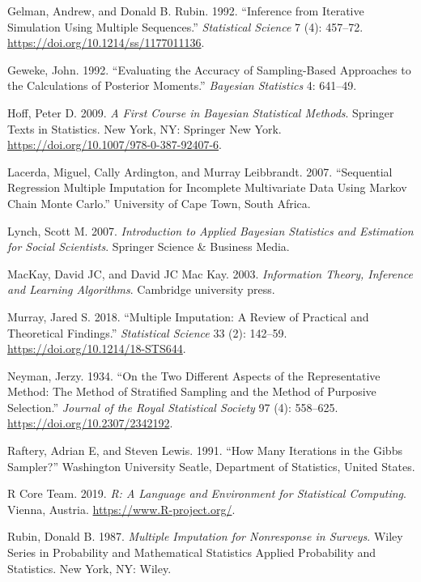 \documentclass[
  Royal, times, sageapa]{sagej}
\begin{document}
\leavevmode\hypertarget{ref-gelm92}{}%
Gelman, Andrew, and Donald B. Rubin. 1992. ``Inference from Iterative
Simulation Using Multiple Sequences.'' \emph{Statistical Science} 7 (4):
457--72. \url{https://doi.org/10.1214/ss/1177011136}.

\leavevmode\hypertarget{ref-gewe92}{}%
Geweke, John. 1992. ``Evaluating the Accuracy of Sampling-Based
Approaches to the Calculations of Posterior Moments.'' \emph{Bayesian
Statistics} 4: 641--49.

\leavevmode\hypertarget{ref-hoff09}{}%
Hoff, Peter D. 2009. \emph{A First Course in Bayesian Statistical
Methods}. Springer Texts in Statistics. New York, NY: Springer New York.
\url{https://doi.org/10.1007/978-0-387-92407-6}.

\leavevmode\hypertarget{ref-lace07}{}%
Lacerda, Miguel, Cally Ardington, and Murray Leibbrandt. 2007.
``Sequential Regression Multiple Imputation for Incomplete Multivariate
Data Using Markov Chain Monte Carlo.'' University of Cape Town, South
Africa.

\leavevmode\hypertarget{ref-lync07}{}%
Lynch, Scott M. 2007. \emph{Introduction to Applied Bayesian Statistics
and Estimation for Social Scientists}. Springer Science \& Business
Media.

\leavevmode\hypertarget{ref-mack03}{}%
MacKay, David JC, and David JC Mac Kay. 2003. \emph{Information Theory,
Inference and Learning Algorithms}. Cambridge university press.

\leavevmode\hypertarget{ref-murr18}{}%
Murray, Jared S. 2018. ``Multiple Imputation: A Review of Practical and
Theoretical Findings.'' \emph{Statistical Science} 33 (2): 142--59.
\url{https://doi.org/10.1214/18-STS644}.

\leavevmode\hypertarget{ref-neym34}{}%
Neyman, Jerzy. 1934. ``On the Two Different Aspects of the
Representative Method: The Method of Stratified Sampling and the Method
of Purposive Selection.'' \emph{Journal of the Royal Statistical
Society} 97 (4): 558--625. \url{https://doi.org/10.2307/2342192}.

\leavevmode\hypertarget{ref-raft91}{}%
Raftery, Adrian E, and Steven Lewis. 1991. ``How Many Iterations in the
Gibbs Sampler?'' Washington University Seatle, Department of Statistics,
United States.

\leavevmode\hypertarget{ref-R}{}%
R Core Team. 2019. \emph{R: A Language and Environment for Statistical
Computing}. Vienna, Austria. \url{https://www.R-project.org/}.

\leavevmode\hypertarget{ref-rubin87}{}%
Rubin, Donald B. 1987. \emph{Multiple Imputation for Nonresponse in
Surveys}. Wiley Series in Probability and Mathematical Statistics
Applied Probability and Statistics. New York, NY: Wiley.
\end{document}
